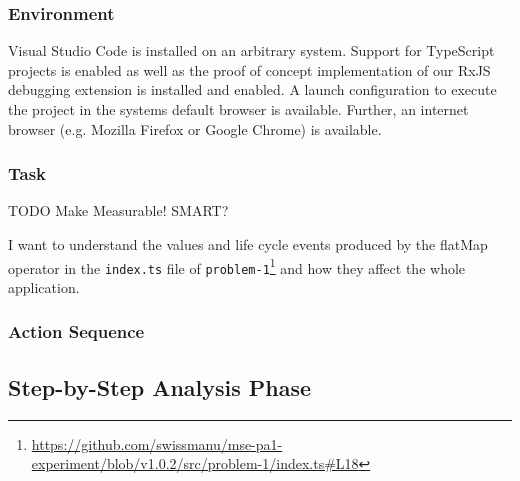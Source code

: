 \documentclass[sigplan,screen,nonacm,review]{acmart}
\begin{document}
\subsubsection{Environment}
Visual Studio Code is installed on an arbitrary system. Support for TypeScript projects is enabled as well as the proof of concept implementation of our RxJS debugging extension is installed and enabled. A launch configuration to execute the project in the systems default browser is available. Further, an internet browser (e.g. Mozilla Firefox or Google Chrome) is available.

\subsubsection{Task}

TODO Make Measurable! SMART?

I want to understand the values and life cycle events produced by the flatMap operator in the \texttt{index.ts} file of \texttt{problem-1}\footnote{\url{https://github.com/swissmanu/mse-pa1-experiment/blob/v1.0.2/src/problem-1/index.ts\#L18}} and how they affect the whole application.

\subsubsection{Action Sequence}

\subsection{Step-by-Step Analysis Phase}

\end{document}
